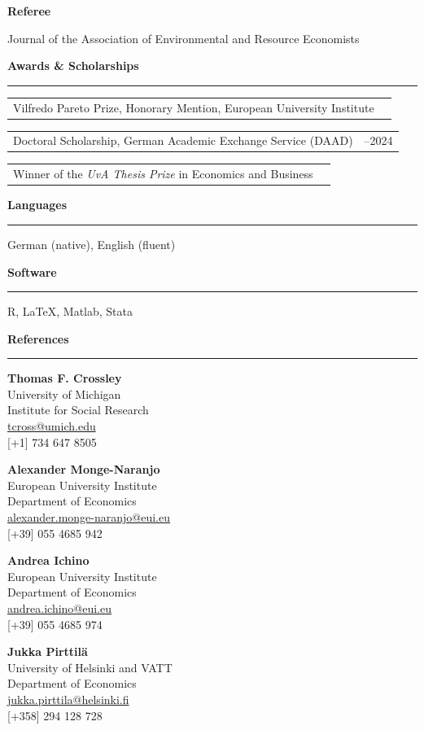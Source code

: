 \documentclass[10pt]{article}
\makeatletter
\newcommand{\cvsection}[1]{%
    \vspace{0.95em}
    {\large\bfseries #1}\par
    \vspace{0.10em}
    \hrule
    \vspace{0.55em}
}
\newcommand{\datedentry}[3]{%
    \begin{tabularx}{\textwidth}{@{}X>{\raggedleft\arraybackslash}p{3.1cm}@{}}
        #1 & #2
    \end{tabularx}
    #3
}
\makeatother
\begin{document}
\textbf{Referee}

\vspace{0.20em}
Journal of the Association of Environmental and Resource Economists

\cvsection{Awards \& Scholarships}

\datedentry{Vilfredo Pareto Prize, Honorary Mention, European University Institute}{2026}{}
\datedentry{Doctoral Scholarship, German Academic Exchange Service (DAAD)}{2020--2024}{}
\datedentry{Winner of the \textit{UvA Thesis Prize} in Economics and Business}{2019}

\cvsection{Languages}

German (native), English (fluent)

\cvsection{Software}

R, \LaTeX, Matlab, Stata

\cvsection{References}

\begin{minipage}[t]{0.48\textwidth}
\textbf{Thomas F. Crossley}\\
University of Michigan\\
Institute for Social Research\\
\href{mailto:tcross@umich.edu}{tcross@umich.edu}\\
{[+1] 734 647 8505}
\end{minipage}
\hfill
\begin{minipage}[t]{0.48\textwidth}
\textbf{Alexander Monge-Naranjo}\\
European University Institute\\
Department of Economics\\
\href{mailto:alexander.monge-naranjo@eui.eu}{alexander.monge-naranjo@eui.eu}\\
{[+39] 055 4685 942}
\end{minipage}

\vspace{0.65em}
\begin{minipage}[t]{0.48\textwidth}
\textbf{Andrea Ichino}\\
European University Institute\\
Department of Economics\\
\href{mailto:andrea.ichino@eui.eu}{andrea.ichino@eui.eu}\\
{[+39] 055 4685 974}
\end{minipage}
\hfill
\begin{minipage}[t]{0.48\textwidth}
\textbf{Jukka Pirttilä}\\
University of Helsinki and VATT\\
Department of Economics\\
\href{mailto:jukka.pirttila@helsinki.fi}{jukka.pirttila@helsinki.fi}\\
{[+358] 294 128 728}
\end{minipage}
\end{document}
